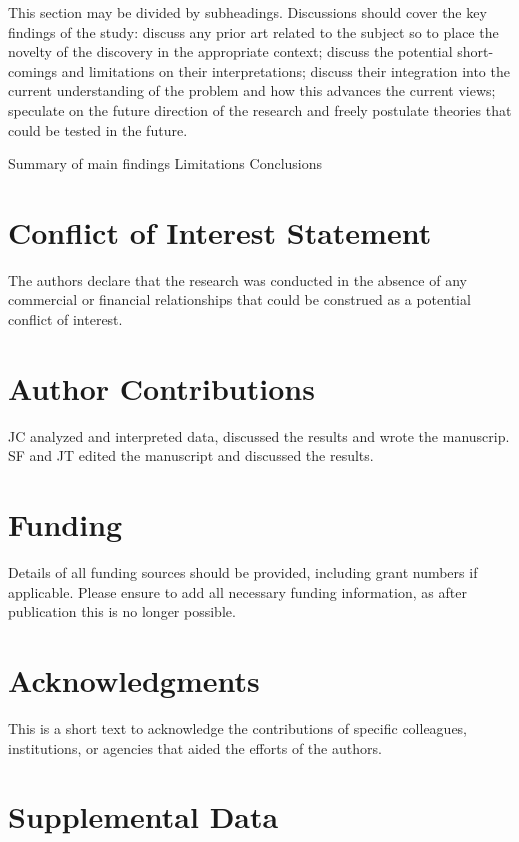 \documentclass{frontiersSCNS}
\begin{document}
This section may be divided by subheadings. Discussions should cover the
key findings of the study: discuss any prior art related to the subject
so to place the novelty of the discovery in the appropriate context;
discuss the potential short-comings and limitations on their
interpretations; discuss their integration into the current
understanding of the problem and how this advances the current views;
speculate on the future direction of the research and freely postulate
theories that could be tested in the future.

Summary of main findings Limitations Conclusions

\section*{Conflict of Interest Statement}

The authors declare that the research was conducted in the absence of
any commercial or financial relationships that could be construed as a
potential conflict of interest.

\section*{Author Contributions}

JC analyzed and interpreted data, discussed the results and wrote the
manuscrip. SF and JT edited the manuscript and discussed the results.

\section*{Funding}

Details of all funding sources should be provided, including grant
numbers if applicable. Please ensure to add all necessary funding
information, as after publication this is no longer possible.

\section*{Acknowledgments}

This is a short text to acknowledge the contributions of specific
colleagues, institutions, or agencies that aided the efforts of the
authors.

\section*{Supplemental Data}
\end{document}
